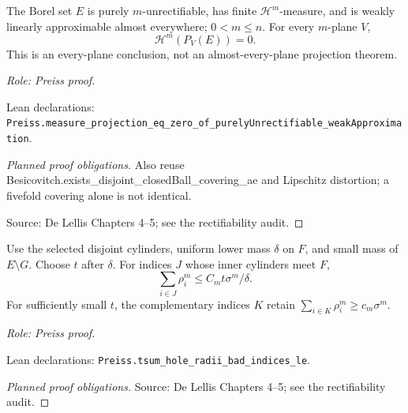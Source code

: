 \begin{lemma}
\label{lem:pure-wla-null-projection}







The Borel set \(E\) is purely \(m\)-unrectifiable, has finite \(\mathcal H^m\)-measure, and is weakly linearly approximable almost everywhere; \(0<m\leq n\).
For every \(m\)-plane \(V\),
\[
 \mathcal H^m(P_V(E))=0.
\]
This is an every-plane conclusion, not an almost-every-plane projection theorem.
\par\emph{Role: Preiss proof.}
\par Lean declarations: \texttt{Preiss.measure\_projection\_eq\_zero\_of\_purelyUnrectifiable\_weakApproximation}.
\end{lemma}
\begin{proof}[Planned proof obligations]

Also reuse Besicovitch.exists\_disjoint\_closedBall\_covering\_ae and Lipschitz distortion; a fivefold covering alone is not identical.
\par Source: De Lellis Chapters 4--5; see the rectifiability audit.
\end{proof}

\begin{lemma}
\label{lem:discarded-cylinder-sum}







Use the selected disjoint cylinders, uniform lower mass \(\delta\) on \(F\), and small mass of \(E\setminus G\). Choose \(t\) after \(\delta\).
For indices \(J\) whose inner cylinders meet \(F\),
\[
 \sum_{i\in J}\rho_i^m\leq C_m t\sigma^m/\delta.
\]
For sufficiently small \(t\), the complementary indices \(K\) retain
\(\sum_{i\in K}\rho_i^m\geq c_m\sigma^m\).
\par\emph{Role: Preiss proof.}
\par Lean declarations: \texttt{Preiss.tsum\_hole\_radii\_bad\_indices\_le}.
\end{lemma}
\begin{proof}[Planned proof obligations]

\par Source: De Lellis Chapters 4--5; see the rectifiability audit.
\end{proof}

